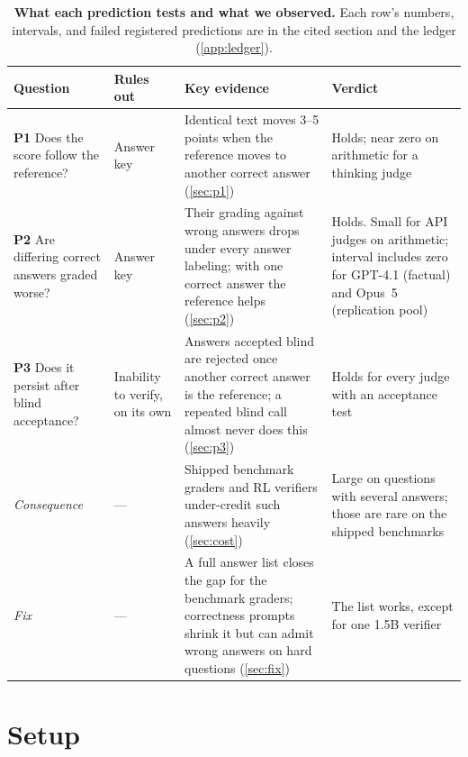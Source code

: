 \documentclass{article}
\begin{document}
\begin{table}[t]
\centering
\small
\caption{\textbf{What each prediction tests and what we observed.} Each row's numbers, intervals, and failed registered predictions are in the cited section and the ledger (\cref{app:ledger}).}
\label{tab:summary}
\setlength{\tabcolsep}{4pt}
\renewcommand{\arraystretch}{1.0}
\begin{tabular}{L{2.9cm}L{2.0cm}L{5.0cm}L{2.7cm}}
\toprule
Question & Rules out & Key evidence & Verdict \\
\midrule
\textbf{P1} Does the score follow the reference? & Answer key & Identical text moves 3--5 points when the reference moves to another correct answer (\cref{sec:p1}) & Holds; near zero on arithmetic for a thinking judge \\
\textbf{P2} Are differing correct answers graded worse? & Answer key & Their grading against wrong answers drops under every answer labeling; with one correct answer the reference helps (\cref{sec:p2}) & Holds. Small for API judges on arithmetic; interval includes zero for GPT-4.1 (factual) and Opus~5 (replication pool) \\
\textbf{P3} Does it persist after blind acceptance? & Inability to verify, on its own & Answers accepted blind are rejected once another correct answer is the reference; a repeated blind call almost never does this (\cref{sec:p3}) & Holds for every judge with an acceptance test \\
\emph{Consequence} & --- & Shipped benchmark graders and RL verifiers under-credit such answers heavily (\cref{sec:cost}) & Large on questions with several answers; those are rare on the shipped benchmarks \\
\emph{Fix} & --- & A full answer list closes the gap for the benchmark graders; correctness prompts shrink it but can admit wrong answers on hard questions (\cref{sec:fix}) & The list works, except for one 1.5B verifier \\
\bottomrule
\end{tabular}
\end{table}

\section{Setup}
\label{sec:setup}
\end{document}
